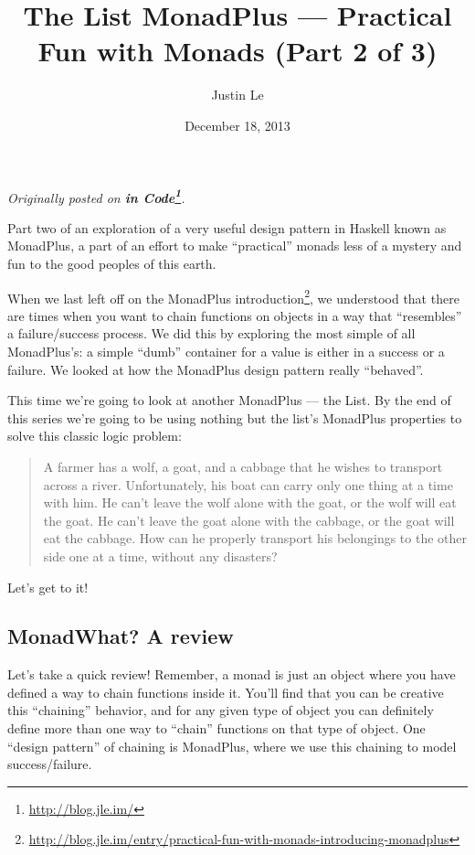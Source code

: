 \documentclass[]{article}
\title{The List MonadPlus --- Practical Fun with Monads (Part 2 of 3)}
\author{Justin Le}
\date{December 18, 2013}
\renewcommand{\href}[2]{#2\footnote{\url{#1}}}
\begin{document}
\maketitle

\emph{Originally posted on \textbf{\href{http://blog.jle.im/}{in
Code}}.}

Part two of an exploration of a very useful design pattern in Haskell
known as MonadPlus, a part of an effort to make ``practical'' monads
less of a mystery and fun to the good peoples of this earth.

When we last left off on the
\href{http://blog.jle.im/entry/practical-fun-with-monads-introducing-monadplus}{MonadPlus
introduction}, we understood that there are times when you want to chain
functions on objects in a way that ``resembles'' a failure/success
process. We did this by exploring the most simple of all MonadPlus's: a
simple ``dumb'' container for a value is either in a success or a
failure. We looked at how the MonadPlus design pattern really
``behaved''.

This time we're going to look at another MonadPlus --- the List. By the
end of this series we're going to be using nothing but the list's
MonadPlus properties to solve this classic logic problem:

\begin{quote}
A farmer has a wolf, a goat, and a cabbage that he wishes to transport
across a river. Unfortunately, his boat can carry only one thing at a
time with him. He can't leave the wolf alone with the goat, or the wolf
will eat the goat. He can't leave the goat alone with the cabbage, or
the goat will eat the cabbage. How can he properly transport his
belongings to the other side one at a time, without any disasters?
\end{quote}

Let's get to it!

\subsection{MonadWhat? A review}\label{monadwhat-a-review}

Let's take a quick review! Remember, a monad is just an object where you
have defined a way to chain functions inside it. You'll find that you
can be creative this ``chaining'' behavior, and for any given type of
object you can definitely define more than one way to ``chain''
functions on that type of object. One ``design pattern'' of chaining is
MonadPlus, where we use this chaining to model success/failure.
\end{document}
